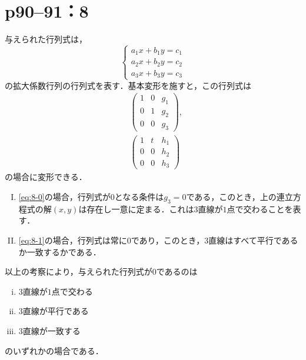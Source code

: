 \documentclass[a4paper,10pt,fleqn]{ltjsarticle}
\begin{document}
\newpage


\section*{p90--91：8}

\begin{tleftbar}
  与えられた行列式は，
  \[
    \begin{cases}
      a_1 x + b_1 y =c_1 \\
      a_2 x + b_2 y =c_2 \\
      a_3 x + b_3 y =c_3
    \end{cases}
  \]
  の拡大係数行列の行列式を表す．基本変形を施すと，この行列式は
  \begin{align}
     & \begin{pmatrix}
         1 & 0 & g_1 \\
         0 & 1 & g_2 \\
         0 & 0 & g_3
       \end{pmatrix}
    \label{eq:8-0}
    ,                 \\
     & \begin{pmatrix}
         1 & t & h_1 \\
         0 & 0 & h_2 \\
         0 & 0 & h_3
       \end{pmatrix}
    \label{eq:8-1}
  \end{align}
  の場合に変形できる．

  \begin{enumerate}[(I)]
    \item \eqref{eq:8-0}の場合，行列式が$0$となる条件は$g_3 =0$である，このとき，上の連立方程式の解$(x,y)$は存在し一意に定まる．これは$3$直線が$1$点で交わることを表す．
    \item \eqref{eq:8-1}の場合，行列式は常に$0$であり，このとき，3直線はすべて平行であるか一致するかである．
  \end{enumerate}

  以上の考察により，与えられた行列式が$0$であるのは
  \begin{enumerate}[(i)]
    \item 3直線が$1$点で交わる
    \item 3直線が平行である
    \item 3直線が一致する
  \end{enumerate}
  のいずれかの場合である．
\end{tleftbar}
\end{document}
